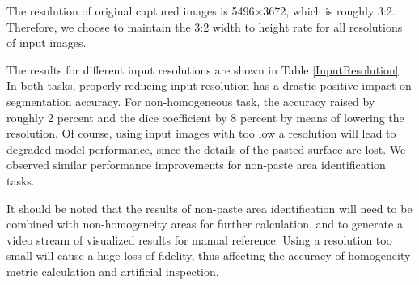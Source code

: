 \documentclass[pdflatex,sn-mathphys]{sn-jnl}%
\theoremstyle{thmstyleone}%
\theoremstyle{thmstyletwo}%
\theoremstyle{thmstylethree}%
\begin{document}
\begin{table}[]
\caption{Comparison between different input resolution}
\label{InputResolution}
\end{table}


The resolution of original captured images is  5496×3672, which is roughly 3:2. 
Therefore, we choose to maintain the 3:2 width to height rate for all resolutions of input images.\par
The results for different input resolutions are shown in Table \ref{InputResolution}. 
In both tasks, properly reducing input resolution has a drastic positive impact on segmentation accuracy. For non-homogeneous task, the accuracy raised by roughly 2 percent and the dice coefficient by 8 percent by means of lowering the resolution. Of course, using input images with too low a resolution will lead to degraded model performance, since the details of the pasted surface are lost. We observed similar performance improvements for non-paste area identification tasks.\par
It should be noted that the results of non-paste area identification will need to be combined with non-homogeneity areas for further calculation, and to generate a video stream of visualized results for manual reference. Using a resolution too small will cause a huge loss of fidelity, thus affecting the accuracy of homogeneity metric calculation and artificial inspection. \par
\end{document}
